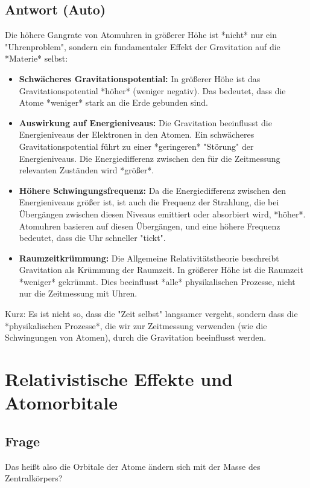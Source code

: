 \documentclass{article}
\begin{document}
	\subsection{Antwort (Auto)}
	Die höhere Gangrate von Atomuhren in größerer Höhe ist *nicht* nur ein "Uhrenproblem", sondern ein fundamentaler Effekt der Gravitation auf die *Materie* selbst:
	\begin{itemize}
		\item \textbf{Schwächeres Gravitationspotential:} In größerer Höhe ist das Gravitationspotential *höher* (weniger negativ). Das bedeutet, dass die Atome *weniger* stark an die Erde gebunden sind.
		\item \textbf{Auswirkung auf Energieniveaus:}  Die Gravitation beeinflusst die Energieniveaus der Elektronen in den Atomen.  Ein schwächeres Gravitationspotential führt zu einer *geringeren* "Störung" der Energieniveaus. Die Energiedifferenz zwischen den für die Zeitmessung relevanten Zuständen wird *größer*.
		\item \textbf{Höhere Schwingungsfrequenz:} Da die Energiedifferenz zwischen den Energieniveaus größer ist, ist auch die Frequenz der Strahlung, die bei Übergängen zwischen diesen Niveaus emittiert oder absorbiert wird, *höher*. Atomuhren basieren auf diesen Übergängen, und eine höhere Frequenz bedeutet, dass die Uhr schneller "tickt".
		\item \textbf{Raumzeitkrümmung:} Die Allgemeine Relativitätstheorie beschreibt Gravitation als Krümmung der Raumzeit. In größerer Höhe ist die Raumzeit *weniger* gekrümmt.  Dies beeinflusst *alle* physikalischen Prozesse, nicht nur die Zeitmessung mit Uhren.
	\end{itemize}
	Kurz: Es ist nicht so, dass die "Zeit selbst" langsamer vergeht, sondern dass die *physikalischen Prozesse*, die wir zur Zeitmessung verwenden (wie die Schwingungen von Atomen), durch die Gravitation beeinflusst werden.
	
	\section{Relativistische Effekte und Atomorbitale}
	\subsection{Frage}
	Das heißt also die Orbitale der Atome ändern sich mit der Masse des Zentralkörpers?
	
\end{document}
